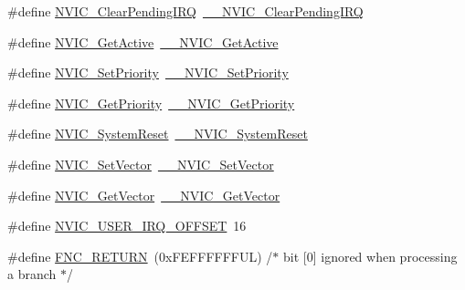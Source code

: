 \begin{DoxyCompactItemize}
\#define \hyperlink{group___c_m_s_i_s___core___n_v_i_c_functions_ga590cf113000a079b1f0ea3dcd5b5316c}{N\+V\+I\+C\+\_\+\+Clear\+Pending\+I\+RQ}~\hyperlink{group___c_m_s_i_s___core___n_v_i_c_functions_ga562a86dbdf14827d0fee8fdafb04d191}{\+\_\+\+\_\+\+N\+V\+I\+C\+\_\+\+Clear\+Pending\+I\+RQ}
\item 
\#define \hyperlink{group___c_m_s_i_s___core___n_v_i_c_functions_ga58ad3f352f832235ab3b192ff4745320}{N\+V\+I\+C\+\_\+\+Get\+Active}~\hyperlink{group___c_m_s_i_s___core___n_v_i_c_functions_gaa2837003c28c45abf193fe5e8d27f593}{\+\_\+\+\_\+\+N\+V\+I\+C\+\_\+\+Get\+Active}
\item 
\#define \hyperlink{group___c_m_s_i_s___core___n_v_i_c_functions_gae0e9d0e2f7b6133828c71b57d4941c35}{N\+V\+I\+C\+\_\+\+Set\+Priority}~\hyperlink{group___c_m_s_i_s___core___n_v_i_c_functions_ga505338e23563a9c074910fb14e7d45fd}{\+\_\+\+\_\+\+N\+V\+I\+C\+\_\+\+Set\+Priority}
\item 
\#define \hyperlink{group___c_m_s_i_s___core___n_v_i_c_functions_gaf59b9d0a791d2157abb319753953eceb}{N\+V\+I\+C\+\_\+\+Get\+Priority}~\hyperlink{group___c_m_s_i_s___core___n_v_i_c_functions_gaeb9dc99c8e7700668813144261b0bc73}{\+\_\+\+\_\+\+N\+V\+I\+C\+\_\+\+Get\+Priority}
\item 
\#define \hyperlink{group___c_m_s_i_s___core___n_v_i_c_functions_ga6aa0367d3642575610476bf0366f0c48}{N\+V\+I\+C\+\_\+\+System\+Reset}~\hyperlink{group___c_m_s_i_s___core___n_v_i_c_functions_ga0d9aa2d30fa54b41eb780c16e35b676c}{\+\_\+\+\_\+\+N\+V\+I\+C\+\_\+\+System\+Reset}
\item 
\#define \hyperlink{group___c_m_s_i_s___core___n_v_i_c_functions_ga804af63bb4c4c317387897431814775d}{N\+V\+I\+C\+\_\+\+Set\+Vector}~\hyperlink{group___c_m_s_i_s___core___n_v_i_c_functions_ga0df355460bc1783d58f9d72ee4884208}{\+\_\+\+\_\+\+N\+V\+I\+C\+\_\+\+Set\+Vector}
\item 
\#define \hyperlink{group___c_m_s_i_s___core___n_v_i_c_functions_ga955eb1c33a3dcc62af11a8385e8c0fc8}{N\+V\+I\+C\+\_\+\+Get\+Vector}~\hyperlink{group___c_m_s_i_s___core___n_v_i_c_functions_ga44b665d2afb708121d9b10c76ff00ee5}{\+\_\+\+\_\+\+N\+V\+I\+C\+\_\+\+Get\+Vector}
\item 
\#define \hyperlink{group___c_m_s_i_s___core___n_v_i_c_functions_ga8045d905a5ca57437d8e6f71ffcb6df5}{N\+V\+I\+C\+\_\+\+U\+S\+E\+R\+\_\+\+I\+R\+Q\+\_\+\+O\+F\+F\+S\+ET}~16
\item 
\#define \hyperlink{group___c_m_s_i_s___core___n_v_i_c_functions_gabaa62910bf89acc186ae998c611e64ab}{F\+N\+C\+\_\+\+R\+E\+T\+U\+RN}~(0x\+F\+E\+F\+F\+F\+F\+F\+F\+U\+L)     /$\ast$ bit \mbox{[}0\mbox{]} ignored when processing a branch                             $\ast$/

\end{DoxyCompactItemize}
